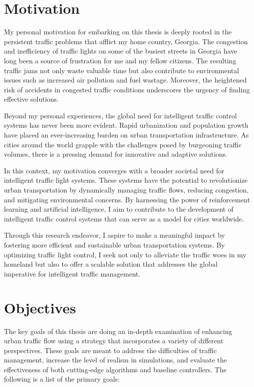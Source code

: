 \section{Motivation}
My personal motivation for embarking on this thesis is deeply rooted in the persistent traffic problems that afflict my home country, Georgia. The congestion and inefficiency of traffic lights on some of the busiest streets in Georgia have long been a source of frustration for me and my fellow citizens. The resulting traffic jams not only waste valuable time but also contribute to environmental issues such as increased air pollution and fuel wastage. Moreover, the heightened risk of accidents in congested traffic conditions underscores the urgency of finding effective solutions.

Beyond my personal experiences, the global need for intelligent traffic control systems has never been more evident. Rapid urbanization and population growth have placed an ever-increasing burden on urban transportation infrastructure. As cities around the world grapple with the challenges posed by burgeoning traffic volumes, there is a pressing demand for innovative and adaptive solutions.

In this context, my motivation converges with a broader societal need for intelligent traffic light systems. These systems have the potential to revolutionize urban transportation by dynamically managing traffic flows, reducing congestion, and mitigating environmental concerns. By harnessing the power of reinforcement learning and artificial intelligence, I aim to contribute to the development of intelligent traffic control systems that can serve as a model for cities worldwide.

Through this research endeavor, I aspire to make a meaningful impact by fostering more efficient and sustainable urban transportation systems. By optimizing traffic light control, I seek not only to alleviate the traffic woes in my homeland but also to offer a scalable solution that addresses the global imperative for intelligent traffic management.


\section{Objectives}
The key goals of this thesis are doing an in-depth examination of enhancing urban traffic flow using a strategy that incorporates a variety of different perspectives. These goals are meant to address the difficulties of traffic management, increase the level of realism in simulations, and evaluate the effectiveness of both cutting-edge algorithms and baseline controllers. The following is a list of the primary goals:

